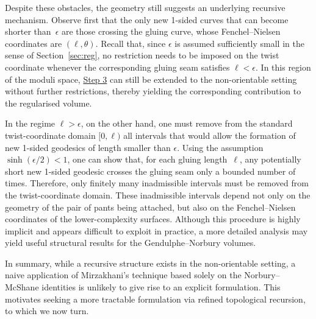 \documentclass[12pt]{amsart}
\theoremstyle{plain}
\theoremstyle{definition}
\theoremstyle{remark}
\numberwithin{equation}{section}
\begin{document}
Despite these obstacles, the geometry still suggests an underlying recursive mechanism.
Observe first that the only new 1-sided curves that can become shorter than~$\epsilon$ are those crossing the gluing curve, whose Fenchel--Nielsen coordinates are $(\ell,\theta)$. Recall that, since $\epsilon$ is assumed sufficiently small in the sense of Section~\ref{sec:reg}, no restriction needs to be imposed on the twist coordinate whenever the corresponding gluing seam satisfies $\ell<\epsilon$. In this region of the moduli space, \hyperref[item:Step3]{Step 3} can still be extended to the non-orientable setting without further restrictions, thereby yielding the corresponding contribution to the regularised volume. 

In the regime $\ell>\epsilon$, on the other hand, one must remove from the standard twist-coordinate domain $[0,\ell)$ all intervals that would allow the formation of new 1-sided geodesics of length smaller than $\epsilon$. Using the assumption $\sinh (\epsilon / 2) < 1$, one can show that, for each gluing length~$\ell$, any potentially short new 1-sided geodesic crosses the gluing seam only a bounded number of times. Therefore, only finitely many inadmissible intervals must be removed from the twist-coordinate domain. These inadmissible intervals depend not only on the geometry of the pair of pants being attached, but also on the Fenchel--Nielsen coordinates of the lower-complexity surfaces. Although this procedure is highly implicit and appears difficult to exploit in practice, a more detailed analysis may yield useful structural results for the Gendulphe--Norbury volumes.


In summary, while a recursive structure exists in the non-orientable setting, a naive application of Mirzakhani's technique based solely on the Norbury--McShane identities is unlikely to give rise to an explicit formulation. This motivates seeking a more tractable formulation via refined topological recursion, to which we now turn.
\end{document}
